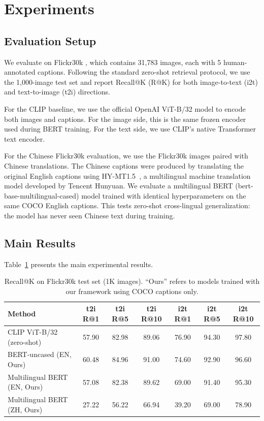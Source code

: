 \documentclass[10pt,leqno]{amsart}
\begin{document}
\section{Experiments}

\subsection{Evaluation Setup}

We evaluate on Flickr30k \citep{plummer2015flickr30k}, which contains 31,783 images, each with 5 human-annotated captions. Following the standard zero-shot retrieval protocol, we use the 1,000-image test set and report Recall@K (R@K) for both image-to-text (i2t) and text-to-image (t2i) directions.

For the CLIP baseline, we use the official OpenAI ViT-B/32 model to encode both images and captions. For the image side, this is the same frozen encoder used during BERT training. For the text side, we use CLIP's native Transformer text encoder.

For the Chinese Flickr30k evaluation, we use the Flickr30k images paired with Chinese translations. The Chinese captions were produced by translating the original English captions using HY-MT1.5~\citep{hymt152025tencent}, a multilingual machine translation model developed by Tencent Hunyuan. We evaluate a multilingual BERT (bert-base-multilingual-cased) model trained with identical hyperparameters on the same COCO English captions. This tests zero-shot cross-lingual generalization: the model has never seen Chinese text during training.

\subsection{Main Results}

Table~\ref{tab:results} presents the main experimental results.

\begin{table}[h]
\centering
\caption{Recall@K on Flickr30k test set (1K images). ``Ours'' refers to models trained with our framework using COCO captions only.}
\label{tab:results}
\begin{tabular}{lcccccc}
\toprule
Method & t2i R@1 & t2i R@5 & t2i R@10 & i2t R@1 & i2t R@5 & i2t R@10 \\
\midrule
CLIP ViT-B/32 (zero-shot) & 57.90 & 82.98 & 89.06 & 76.90 & 94.30 & 97.80 \\
BERT-uncased (EN, Ours)   & 60.48 & 84.96 & 91.00 & 74.60 & 92.90 & 96.60 \\
\midrule
Multilingual BERT (EN, Ours) & 57.08 & 82.38 & 89.62 & 69.00 & 91.40 & 95.30 \\
Multilingual BERT (ZH, Ours) & 27.22 & 56.22 & 66.94 & 39.20 & 69.00 & 78.90 \\
\bottomrule
\end{tabular}
\end{table}
\end{document}
